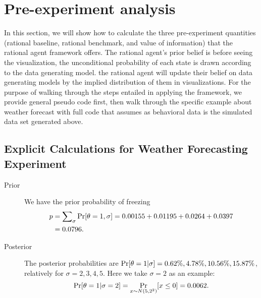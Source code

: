 \documentclass{article}
\begin{document}
\section{Pre-experiment analysis}

In this section, we will show how to calculate the three pre-experiment quantities (rational baseline, rational benchmark, and value of information) that the rational agent framework offers. The rational agent's prior belief is before seeing the visualization, the unconditional probability of each state is drawn according to the data generating model. the rational agent will update their belief on data generating models by the implied distribution of them in visualizations. For the purpose of walking through the steps entailed in applying the framework, we provide general pseudo code first, then walk through the specific example about weather forecast with full code that assumes as behavioral data is the simulated data set generated above.

\subsection{Explicit Calculations for Weather Forecasting Experiment}


\begin{description}
    \item[Prior] We have the prior probability of freezing 
\begin{align*}
    p &= \sum\nolimits_\sigma \Pr[\theta = 1 , \sigma]=0.00155+0.01195+0.0264+0.0397\\
    &=0.0796.
\end{align*}

\item [Posterior] The posterior probabilities are $\Pr[\theta=1|\sigma]=0.62\%, 4.78\%, 10.56\%, 15.87\%$, relatively for $\sigma=2, 3, 4, 5$. Here we take $\sigma = 2$ as an example:
\begin{equation*}
    \Pr[\theta=1 | \sigma = 2] = \Pr_{ x\sim N(5, 2^2)}[x\leq 0]=0.0062.
\end{equation*}

\end{description}
\end{document}
